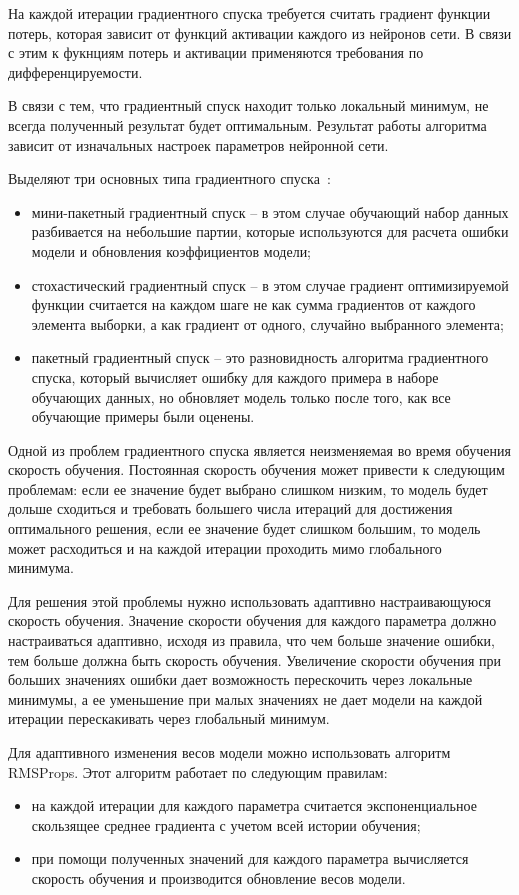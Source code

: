 На каждой итерации градиентного спуска требуется считать градиент функции потерь, которая зависит от функций активации каждого из нейронов сети. 
В связи с этим к фукнциям потерь и активации применяются требования по дифференцируемости.

В связи с тем, что градиентный спуск находит только локальный минимум, не всегда полученный результат будет оптимальным. 
Результат работы алгоритма зависит от изначальных настроек параметров нейронной сети.

Выделяют три основных типа градиентного спуска~\cite{gradient}:
\begin{itemize}
	\item мини-пакетный градиентный спуск -- в этом случае обучающий набор данных разбивается на небольшие партии, которые используются для расчета ошибки модели и обновления коэффициентов модели;
	\item стохастический градиентный спуск -- в этом случае градиент оптимизируемой функции считается на каждом шаге не как сумма градиентов от каждого элемента выборки, а как градиент от одного, случайно выбранного элемента;
	\item пакетный градиентный спуск -- это разновидность
	алгоритма градиентного спуска, который вычисляет ошибку для	каждого примера в наборе обучающих данных, но обновляет модель только после того, как все обучающие примеры были оценены.
\end{itemize}

Одной из проблем градиентного спуска является неизменяемая во время обучения скорость обучения. 
Постоянная скорость обучения может привести к следующим проблемам: если ее значение будет выбрано слишком низким, то модель будет дольше сходиться и требовать большего числа итераций для достижения оптимального решения, если ее значение будет слишком большим, то модель может расходиться и на каждой итерации проходить мимо глобального минимума.

Для решения этой проблемы нужно использовать адаптивно настраивающуюся скорость обучения.
Значение скорости обучения для каждого параметра должно настраиваться адаптивно, исходя из правила, что чем больше значение ошибки, тем больше должна быть скорость обучения. 
Увеличение скорости обучения при больших значениях ошибки дает возможность перескочить через локальные минимумы, а ее уменьшение при малых значениях не дает модели на каждой итерации перескакивать через глобальный минимум.

Для адаптивного изменения весов модели можно использовать алгоритм RMSProps. Этот алгоритм работает по следующим правилам:
\begin{itemize}
	\item на каждой итерации для каждого параметра считается экспоненциальное скользящее среднее градиента с учетом всей истории обучения;
	\item при помощи полученных значений для каждого параметра вычисляется скорость обучения и производится обновление весов модели.
\end{itemize}

